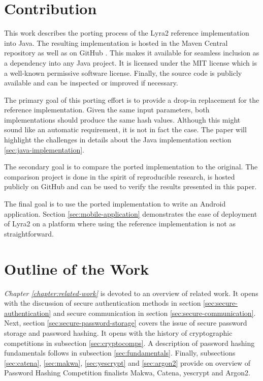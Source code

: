 \section{Contribution}
This work describes the porting process of the Lyra2 reference implementation into Java. The resulting implementation is hosted in the Maven Central repository \cite{maven:2017:lyra2} as well as on GitHub \cite{github:2017:lyra2-java}. This makes it available for seamless inclusion as a dependency into any Java project. It is licensed under the MIT license which is a well-known permissive software license. Finally, the source code is publicly available and can be inspected or improved if necessary.

The primary goal of this porting effort is to provide a drop-in replacement for the reference implementation. Given the same input parameters, both implementations should produce the same hash values. Although this might sound like an automatic requirement, it is not in fact the case. The paper will highlight the challenges in details about the Java implementation section \ref{sec:java-implementation}.

The secondary goal is to compare the ported implementation to the original. The comparison project is done in the spirit of reproducible research, is hosted publicly on GitHub \cite{github:2017:lyra2-compare} and can be used to verify the results presented in this paper.

The final goal is to use the ported implementation to write an Android application. Section \ref{sec:mobile-application} demonstrates the ease of deployment of Lyra2 on a platform where using the reference implementation is not as straightforward.

\section{Outline of the Work}

\emph{Chapter \ref{chapter:related-work}} is devoted to an overview of related work. It opens with the discussion of secure authentication methods in section \ref{sec:secure-authentication} and secure communication in section \ref{sec:secure-communication}. Next, section \ref{sec:secure-password-storage} covers the issue of secure password storage and password hashing. It opens with the history of cryptographic competitions in subsection \ref{sec:cryptocomps}. A description of password hashing fundamentals follows in subsection \ref{sec:fundamentals}. Finally, subsections \ref{sec:catena}, \ref{sec:makwa}, \ref{sec:yescrypt} and \ref{sec:argon2} provide on overview of Password Hashing Competition finalists Makwa, Catena, yescrypt and Argon2.


